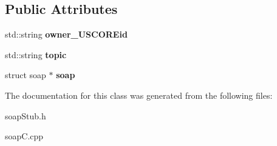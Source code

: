 \subsection*{Public Attributes}
\begin{DoxyCompactItemize}
\item 
\hypertarget{class__pass____retract__USCOREtopic_a0e23f1f8090acf6a5418700570eca40f}{
std::string {\bfseries owner\_\-USCOREid}}
\label{class__pass____retract__USCOREtopic_a0e23f1f8090acf6a5418700570eca40f}

\item 
\hypertarget{class__pass____retract__USCOREtopic_a8012730e48ad36ceabec90b424939197}{
std::string {\bfseries topic}}
\label{class__pass____retract__USCOREtopic_a8012730e48ad36ceabec90b424939197}

\item 
\hypertarget{class__pass____retract__USCOREtopic_ae0a8d0c8d4e03ccf820fa8155635ca36}{
struct soap $\ast$ {\bfseries soap}}
\label{class__pass____retract__USCOREtopic_ae0a8d0c8d4e03ccf820fa8155635ca36}

\end{DoxyCompactItemize}


The documentation for this class was generated from the following files:\begin{DoxyCompactItemize}
\item 
soapStub.h\item 
soapC.cpp\end{DoxyCompactItemize}
